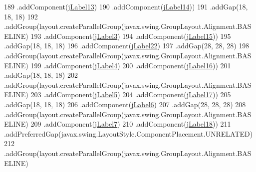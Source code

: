 \begin{DoxyCode}
189                     .addComponent(\mbox{\hyperlink{class_interfaz_package_1_1_interfaz_consulta_factura_a57b866843fb85f8fa14ad3f78bafe6ed}{jLabel13}})
190                     .addComponent(\mbox{\hyperlink{class_interfaz_package_1_1_interfaz_consulta_factura_ac1f0ed85064a9ed6bac8edad397a6c55}{jLabel14}}))
191                 .addGap(18, 18, 18)
192                 .addGroup(layout.createParallelGroup(javax.swing.GroupLayout.Alignment.BASELINE)
193                     .addComponent(\mbox{\hyperlink{class_interfaz_package_1_1_interfaz_consulta_factura_a05ebb163b51721c3ff33b7ac276766e7}{jLabel3}})
194                     .addComponent(\mbox{\hyperlink{class_interfaz_package_1_1_interfaz_consulta_factura_afb0f847d7f072d789f7dce6ef6fb2189}{jLabel15}}))
195                 .addGap(18, 18, 18)
196                 .addComponent(\mbox{\hyperlink{class_interfaz_package_1_1_interfaz_consulta_factura_a338924ad3911c841159af6eb75aa2473}{jLabel22}})
197                 .addGap(28, 28, 28)
198                 .addGroup(layout.createParallelGroup(javax.swing.GroupLayout.Alignment.BASELINE)
199                     .addComponent(\mbox{\hyperlink{class_interfaz_package_1_1_interfaz_consulta_factura_a7d36559d1213a95e83abba6d9c92199b}{jLabel4}})
200                     .addComponent(\mbox{\hyperlink{class_interfaz_package_1_1_interfaz_consulta_factura_a587aaa1d1e0e2ca30b4d2200fd1728e4}{jLabel16}}))
201                 .addGap(18, 18, 18)
202                 .addGroup(layout.createParallelGroup(javax.swing.GroupLayout.Alignment.BASELINE)
203                     .addComponent(\mbox{\hyperlink{class_interfaz_package_1_1_interfaz_consulta_factura_a375c733d68f59477fc27bdeb6ea2dae9}{jLabel5}})
204                     .addComponent(\mbox{\hyperlink{class_interfaz_package_1_1_interfaz_consulta_factura_a041b6262d6b6883bcbc9ffed38bcdcdd}{jLabel17}}))
205                 .addGap(18, 18, 18)
206                 .addComponent(\mbox{\hyperlink{class_interfaz_package_1_1_interfaz_consulta_factura_a0769a03c29fa86b156dbb861f170e3cf}{jLabel6}})
207                 .addGap(28, 28, 28)
208                 .addGroup(layout.createParallelGroup(javax.swing.GroupLayout.Alignment.BASELINE)
209                     .addComponent(\mbox{\hyperlink{class_interfaz_package_1_1_interfaz_consulta_factura_a590afc655fceef038e603a5471cf720e}{jLabel7}})
210                     .addComponent(\mbox{\hyperlink{class_interfaz_package_1_1_interfaz_consulta_factura_a352b4e6a3aa39375f57c78e2740b4cd9}{jLabel18}}))
211                 .addPreferredGap(javax.swing.LayoutStyle.ComponentPlacement.UNRELATED)
212                 .addGroup(layout.createParallelGroup(javax.swing.GroupLayout.Alignment.BASELINE)

\end{DoxyCode}
